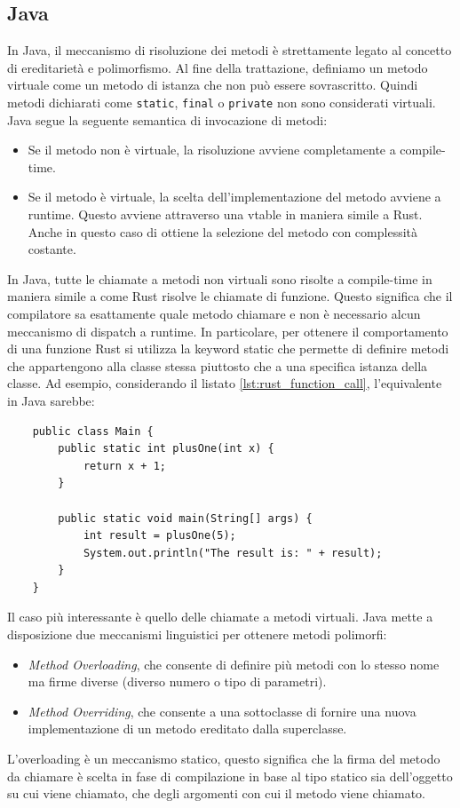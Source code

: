 \subsection{Java}
In Java, il meccanismo di risoluzione dei metodi è strettamente legato al concetto di ereditarietà e polimorfismo. Al fine della trattazione, definiamo un metodo virtuale come un metodo di istanza che non può essere sovrascritto. Quindi metodi dichiarati come \texttt{static}, \texttt{final} o \texttt{private} non sono considerati virtuali. Java segue la seguente semantica di invocazione di metodi:
\begin{itemize}
    \item Se il metodo non è virtuale, la risoluzione avviene completamente a compile-time.
    \item Se il metodo è virtuale, la scelta dell'implementazione del metodo avviene a runtime. Questo avviene attraverso una vtable in maniera simile a Rust. Anche in questo caso di ottiene la selezione del metodo con complessità costante. 
\end{itemize} 
In Java, tutte le chiamate a metodi non virtuali sono risolte a compile-time in maniera simile a come Rust risolve le chiamate di funzione. Questo significa che il compilatore sa esattamente quale metodo chiamare e non è necessario alcun meccanismo di dispatch a runtime. In particolare, per ottenere il comportamento di una funzione Rust si utilizza la keyword static che permette di definire metodi che appartengono alla classe stessa piuttosto che a una specifica istanza della classe. Ad esempio, considerando il listato \ref{lst:rust_function_call}, l'equivalente in Java sarebbe:
\begin{verbatim}
    public class Main {
        public static int plusOne(int x) {
            return x + 1;
        }

        public static void main(String[] args) {
            int result = plusOne(5);
            System.out.println("The result is: " + result);
        }
    }
\end{verbatim}
Il caso più interessante è quello delle chiamate a metodi virtuali. Java mette a disposizione due meccanismi linguistici per ottenere metodi polimorfi:
\begin{itemize}
    \item \textit{Method Overloading}, che consente di definire più metodi con lo stesso nome ma firme diverse (diverso numero o tipo di parametri). 
    \item \textit{Method Overriding}, che consente a una sottoclasse di fornire una nuova implementazione di un metodo ereditato dalla superclasse. 
\end{itemize}
L'overloading è un meccanismo statico, questo significa che la firma del metodo da chiamare è scelta in fase di compilazione in base al tipo statico sia dell'oggetto su cui viene chiamato, che degli argomenti con cui il metodo viene chiamato.

